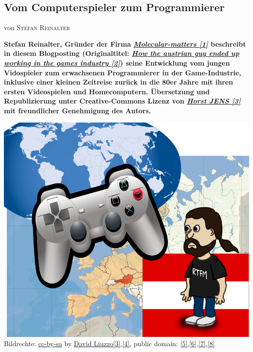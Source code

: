\documentclass[10pt,a4paper,ngerman,twoside]{article} %
\newcommand{\NewsItem}[1]{ %
\usefont{T1}{fvs}{n}{n} %
\vspace{24pt}\large #1\vspace{3pt} %
\par \normalsize \normalfont}
\newcommand{\NewsAuthor}[1]{ %
\hfill von \textsc{#1} \vspace{20pt} %
\par \normalfont}
\begin{document}
\begin{multicols}{3} 
\NewsItem{}
\section*{Vom Computerspieler zum Programmierer} 
\label{austrianguy}
\NewsAuthor{Stefan Reinalter}

\textbf{Stefan Reinalter, Gründer der Firma \href{http://www.molecular-matters.com/}{\textit{Molecular-matters [1]}} beschreibt in diesem Blogposting (Originaltitel: \href{http://www.altdevblogaday.com/2011/09/27/how-the-austrian-guy-ended-up-working-in-the-games-industry/}{\textit{How the austrian guy ended up working in the games industry [2]}}) seine Entwicklung vom jungen Vidospieler zum erwachsenen Programmierer in der Game-Industrie, inklusive einer kleinen Zeitreise zurück in die 80er Jahre mit ihren ersten Videospielen und Homecomputern. Übersetzung und Republizierung unter Creative-Commons Lizenz von \href{http://spielend-programmieren.at}{\textit{Horst JENS [3]}} mit freundlicher Genehmigung des Autors.}
\begin{center}
\includegraphics[width=\linewidth]{austrianguy/austrianguy.png} \\
\footnotesize{Bildrechte: \href{https://creativecommons.org/licenses/by-sa/4.0/deed.en}{cc-by-sa} by \href{https://commons.wikimedia.org/wiki/User:David_Liuzzo}{David Liuzzo[3],}\href{https://commons.wikimedia.org/wiki/File:EU_location_AUT.png}{[4],} public domain: \href{http://openclipart.org/detail/175351/playstation-controller-by-matthewhenninger-175351}{[5],}\href{http://openclipart.org/detail/21847/comic-characters:-bearded-guy-by-nicubunu}{[6],}\href{http://openclipart.org/detail/7885/blue-world-map-by-neocreo}{[7],}\href{http://openclipart.org/detail/12612/flag-of-austria-by-anonymous}{[8]}} \\

\end{center}
\end{multicols}
\end{document}
